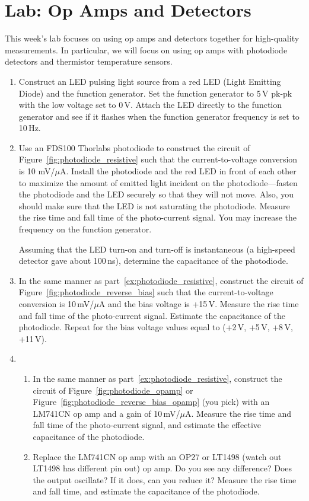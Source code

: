 \documentclass{article}
\begin{document}
\section{Lab: Op Amps and Detectors}

This week's lab focuses on using op amps and detectors together for high-quality measurements. In particular, we will focus on using op amps with photodiode detectors and thermistor temperature sensors.

\begin{enumerate}
\item Construct an LED pulsing light source from a red LED (Light Emitting Diode) and the function generator. Set the function generator to 5\,V pk-pk with the low voltage set to 0\,V. Attach the LED directly to the function generator and see if it flashes when the function generator frequency is set to 10\,Hz.

\item \label{ex:photodiode_resistive} Use an FDS100 Thorlabs photodiode to construct the circuit of Figure~\ref{fig:photodiode_resistive} such that the current-to-voltage conversion is 10 mV/$\mu$A. Install the photodiode and the red LED in front of each other to maximize the amount of emitted light incident on the photodiode---fasten the photodiode and the LED securely so that they will not move. Also, you should make sure that the LED is not saturating the photodiode. Measure the rise time and fall time of the photo-current signal. You may increase the frequency on the function generator.

Assuming that the LED turn-on and turn-off is instantaneous (a high-speed detector gave about 100\,ns), determine the capacitance of the photodiode.

\item In the same manner as part~\ref{ex:photodiode_resistive}, construct the circuit of Figure~\ref{fig:photodiode_reverse_bias} such that the current-to-voltage conversion is 10\,mV/$\mu$A and the bias voltage is +15\,V. Measure the rise time and fall time of the photo-current signal. Estimate the capacitance of the photodiode. Repeat for the bias voltage values equal to (+2\,V, +5\,V, +8\,V, +11\,V).

\item \begin{enumerate}
\item In the same manner as part~\ref{ex:photodiode_resistive}, construct the circuit of Figure~\ref{fig:photodiode_opamp} or Figure~\ref{fig:photodiode_reverse_bias_opamp} (you pick) with an LM741CN op amp and a gain of 10\,mV/$\mu$A. Measure the rise time and fall time of the photo-current signal, and estimate the effective capacitance of the photodiode.
\item Replace the LM741CN op amp with an OP27 or LT1498 (watch out LT1498 has different pin out) op amp. Do you see any difference? Does the output oscillate? If it does, can you reduce it?  Measure the rise time and fall time, and estimate the capacitance of the photodiode.
\end{enumerate}


\end{enumerate}
\end{document}
